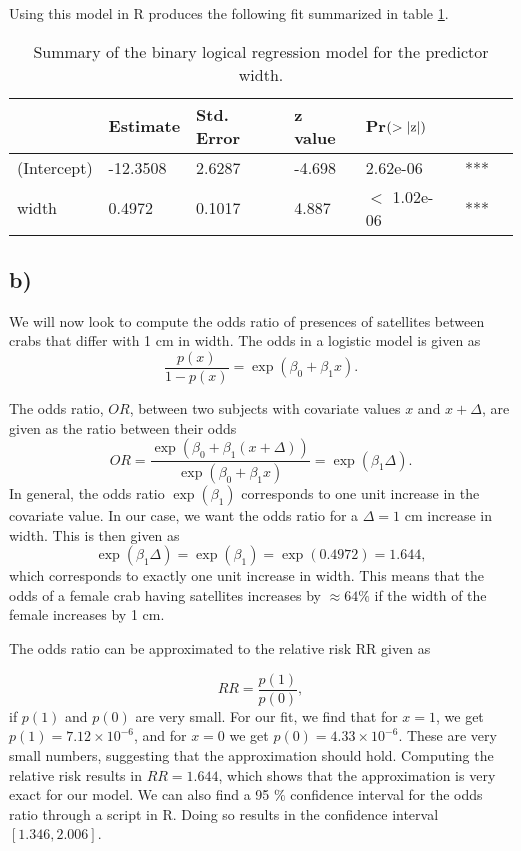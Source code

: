 \documentclass[a4paper, 10pt, reqno]{amsart}
\begin{document}
Using this model in R produces the following fit summarized in table \ref{tab: 1}.

\begin{table}
\caption{Summary of the binary logical regression model for the predictor width.}
\label{tab: 1}
\begin{tabular}{lllllll}
\hline\hline
 & Estimate  & Std. Error & z value & Pr$(>\abs{\mathrm{z}})$ & \\ \hline
(Intercept) & -12.3508 & 2.6287   & -4.698  & 2.62e-06 & ***\\
width   & 0.4972 & 0.1017   & 4.887  & $<$ 1.02e-06 & ***\\
\hline
\end{tabular}
\end{table}

\subsection{b)}
We will now look to compute the odds ratio of presences of satellites between crabs that differ with 1 cm in width. The odds in a logistic model is given as
\begin{equation}
    \frac{p(x)}{1 - p(x)} = \exp(\beta_0 + \beta_1 x).
\end{equation}

The odds ratio, $OR$, between two subjects with covariate values $x$ and $x + \Delta$, are given as the ratio between their odds
\begin{equation}
    OR = \frac{\exp(\beta_0 + \beta_1(x + \Delta))}{\exp(\beta_0 + \beta_1 x)} = \exp(\beta_1 \Delta).
\end{equation}
In general, the odds ratio $\exp(\beta_1)$ corresponds to one unit increase in the covariate value. In our case, we want the odds ratio for a $\Delta = 1$ cm increase in width. This is then given as 
\begin{equation}
    \exp(\beta_1\Delta) = \exp(\beta_1) = \exp(0.4972) = 1.644,
\end{equation}
which corresponds to exactly one unit increase in width. This means that the odds of a female crab having satellites increases by $\approx 64\%$ if the width of the female increases by 1 cm.

The odds ratio can be approximated to the relative risk RR given as 

\begin{equation}
    RR = \frac{p(1)}{p(0)},
\end{equation}
if $p(1)$ and $p(0)$ are very small. For our fit, we find that for $x=1$, we get $p(1) = 7.12\times 10^{-6}$, and for $x = 0$ we get $p(0) = 4.33\times 10^{-6}$. These are very small numbers, suggesting that the approximation should hold. Computing the relative risk results in $RR = 1.644$, which shows that the approximation is very exact for our model. We can also find a 95 $\%$ confidence interval for the odds ratio through a script in R. Doing so results in the confidence interval $[1.346, 2.006]$.
\end{document}
